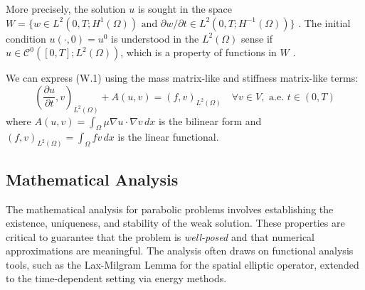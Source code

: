\documentclass[
  11pt,
]{article}
\begin{document}
\begin{enumerate}
  More precisely, the solution $u$ is sought in the space
  $W = \{w \in L^2(0,T;H^1(\Omega)) \text{ and } \partial w/\partial t\in L^2(0,T;H^{-1}(\Omega))\}$
  \cite{picasso1998}. The initial condition $u(\cdot,0)=u^0$ is understood in
  the $L^2(\Omega)$ sense if
  $u \in \mathcal{C}^0([0,T];L^2(\Omega))$, which is a property of
  functions in $W$ \cite{picasso1998}.

  We can express (W.1) using the mass matrix-like and stiffness
  matrix-like terms: \[
  \left( \frac{\partial u}{\partial t}, v \right)_{L^2(\Omega)} + A(u, v) = (f, v)_{L^2(\Omega)} \quad \forall v \in V, \text{ a.e. } t \in (0, T)
  \] where $A(u, v) = \int_{\Omega} \mu \nabla u \cdot \nabla v \, dx$
  is the bilinear form and
  $(f, v)_{L^2(\Omega)} = \int_{\Omega} f v \, dx$ is the linear
  functional.
\end{enumerate}

\subsection{Mathematical Analysis}

The mathematical analysis for parabolic problems involves establishing
the existence, uniqueness, and stability of the weak solution. These
properties are critical to guarantee that the problem is \textit{well-posed} and
that numerical approximations are meaningful. The analysis often draws
on functional analysis tools, such as the Lax-Milgram Lemma for the
spatial elliptic operator, extended to the time-dependent setting via
energy methods.
\end{document}
